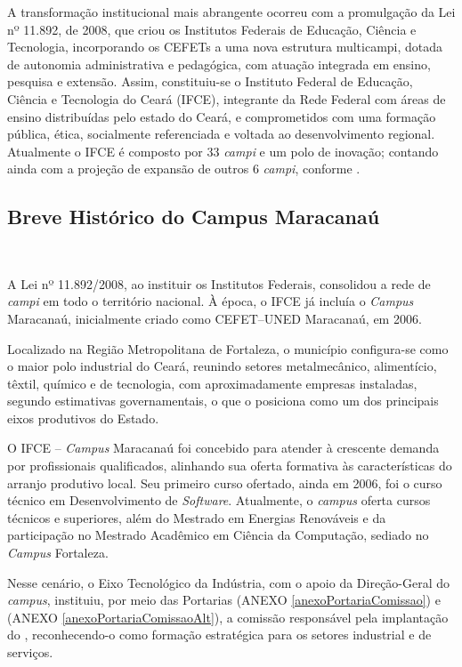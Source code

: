 A transformação institucional mais abrangente ocorreu com a promulgação da Lei nº 11.892, de 2008, que criou os Institutos Federais de Educação, Ciência e Tecnologia, incorporando os CEFETs a uma nova estrutura multicampi, dotada de autonomia administrativa e pedagógica, com atuação integrada em ensino, pesquisa e extensão. Assim, constituiu-se o Instituto Federal de Educação, Ciência e Tecnologia do Ceará (IFCE), integrante da Rede Federal com áreas de ensino distribuídas pelo estado do Ceará, e comprometidos com uma formação pública, ética, socialmente referenciada e voltada ao desenvolvimento regional. Atualmente o IFCE é composto por 33 \textit{campi} e um polo de inovação; contando ainda com a projeção de expansão de outros 6 \textit{campi}, conforme . 

\subsection{Breve Histórico do Campus Maracanaú}
~

A Lei nº 11.892/2008, ao instituir os Institutos Federais, consolidou a rede de \textit{campi} em todo o território nacional. À época, o IFCE já incluía o \textit{Campus} Maracanaú, inicialmente criado como CEFET–UNED Maracanaú, em 2006.

Localizado na Região Metropolitana de Fortaleza, o município configura-se como o maior polo industrial do Ceará, reunindo setores metalmecânico, alimentício, têxtil, químico e de tecnologia, com aproximadamente {} empresas instaladas, segundo estimativas governamentais, o que o posiciona como um dos principais eixos produtivos do Estado.

O IFCE – \textit{Campus} Maracanaú foi concebido para atender à crescente demanda por profissionais qualificados, alinhando sua oferta formativa às características do arranjo produtivo local. Seu primeiro curso ofertado, ainda em 2006, foi o curso técnico em Desenvolvimento de \textit{Software}. Atualmente, o \textit{campus} oferta cursos técnicos e superiores, além do Mestrado em Energias Renováveis e da participação no Mestrado Acadêmico em Ciência da Computação, sediado no \textit{Campus} Fortaleza.

Nesse cenário, o Eixo Tecnológico da Indústria, com o apoio da Direção-Geral do \textit{campus}, instituiu, por meio das Portarias \PORTARIACOMISSAO (ANEXO \ref{anexoPortariaComissao}) e \PORTARIACOMISSAOALT (ANEXO \ref{anexoPortariaComissaoAlt}), a comissão responsável pela implantação do \NOMECURSO, reconhecendo-o como formação estratégica para os setores industrial e de serviços.

